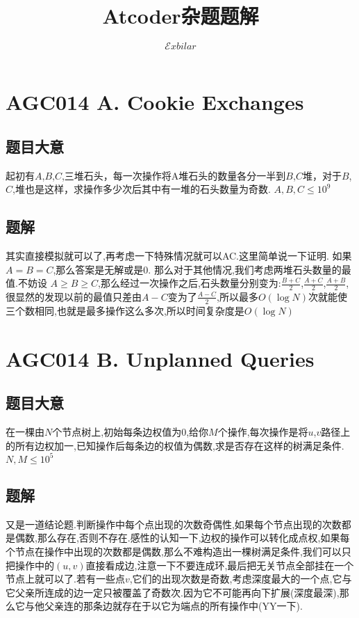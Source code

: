 \documentclass[landscape]{article}
\date{}
\title{Atcoder杂题题解}
\author{$\mathcal Exbilar$}
\begin{document}
\maketitle

\section{AGC014 A. Cookie Exchanges}

\subsection{题目大意}

起初有$A$,$B$,$C$,三堆石头，每一次操作将A堆石头的数量各分一半到$B$,$C$堆，对于$B$,$C$,堆也是这样，求操作多少次后其中有一堆的石头数量为奇数. $A,B,C \le { 10 }^{ 9 }$

\subsection{题解}

其实直接模拟就可以了,再考虑一下特殊情况就可以AC.这里简单说一下证明.
如果$A=B=C$,那么答案是无解或是0.
那么对于其他情况,我们考虑两堆石头数量的最值.不妨设 $A \ge B \ge C$,那么经过一次操作之后,石头数量分别变为:$\frac { B + C }{2}$,$\frac { A + C }{2}$,$\frac { A + B }{2}$,很显然的发现以前的最值只差由$A-C$变为了$\frac {A - C}{2}$,所以最多$O(\log{N})$次就能使三个数相同,也就是最多操作这么多次,所以时间复杂度是$O({\log {N}})$ 

\newpage

\section{AGC014 B. Unplanned Queries}

\subsection{题目大意}

在一棵由$N$个节点树上,初始每条边权值为$0$,给你$M$个操作,每次操作是将$u$,$v$路径上的所有边权加一,已知操作后每条边的权值为偶数,求是否存在这样的树满足条件. $N,M \le {10}^{5}$

\subsection{题解}

又是一道结论题.判断操作中每个点出现的次数奇偶性,如果每个节点出现的次数都是偶数,那么存在,否则不存在.感性的认知一下,边权的操作可以转化成点权,如果每个节点在操作中出现的次数都是偶数,那么不难构造出一棵树满足条件,我们可以只把操作中的$(u,v)$直接看成边,注意一下不要连成环,最后把无关节点全部挂在一个节点上就可以了.若有一些点$v$,它们的出现次数是奇数,考虑深度最大的一个点,它与它父亲所连成的边一定只被覆盖了奇数次.因为它不可能再向下扩展(深度最深),那么它与他父亲连的那条边就存在于以它为端点的所有操作中(YY一下).
\end{document}
